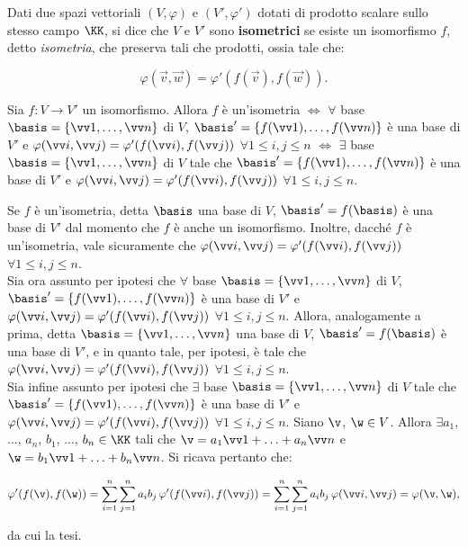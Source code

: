 \documentclass[11pt]{article}
\begin{document}
	\begin{definition}
		Dati due spazi vettoriali $(V, \varphi)$ e
		$(V', \varphi')$ dotati di prodotto scalare sullo stesso campo $\KK$, si dice che
		$V$ e $V'$ sono \textbf{isometrici} se esiste un isomorfismo
		$f$, detto \textit{isometria}, che preserva tali che prodotti, ossia tale che:
		
		\[ \varphi(\vec v, \vec w) = \varphi'(f(\vec v), f(\vec w)). \]
	\end{definition}

	\begin{exercise} Sia $f : V \to V'$ un isomorfismo. Allora $f$ è un'isometria $\iff$ $\forall$ base $\basis = \{ \vv 1, \ldots, \vv n \}$ di $V$, $\basis' = \{ f(\vv 1), \ldots, f(\vv n) \}$ è una base di $V'$ e $\varphi(\vv i, \vv j) = \varphi'(f(\vv i), f(\vv j))$ $\forall 1 \leq i, j \leq n$ $\iff$ $\exists$ base $\basis = \{ \vv 1, \ldots, \vv n \}$ di $V$ tale che $\basis' = \{ f(\vv 1), \ldots, f(\vv n) \}$ è una base di $V'$ e $\varphi(\vv i, \vv j) = \varphi'(f(\vv i), f(\vv j))$ $\forall 1 \leq i, j \leq n$.
	\end{exercise}

	\begin{solution} Se $f$ è un'isometria, detta $\basis$ una base di $V$, $\basis' = f(\basis)$ è una base di $V'$
		dal momento che $f$ è anche un isomorfismo. Inoltre, dacché $f$ è un'isometria, vale sicuramente che
		$\varphi(\vv i, \vv j) = \varphi'(f(\vv i), f(\vv j))$ $\forall 1 \leq i, j \leq n$. \\
		
		Sia ora assunto per ipotesi che $\forall$ base $\basis = \{ \vv 1, \ldots, \vv n \}$ di $V$, $\basis' = \{ f(\vv 1), \ldots, f(\vv n) \}$ è una base di $V'$ e $\varphi(\vv i, \vv j) = \varphi'(f(\vv i), f(\vv j))$ $\forall 1 \leq i, j \leq n$. Allora, analogamente a prima, detta $\basis = \{ \vv 1, \ldots, \vv n \}$ una base di $V$, $\basis' = f(\basis)$ è una base di $V'$, e in quanto tale,
		per ipotesi, è tale che $\varphi(\vv i, \vv j) = \varphi'(f(\vv i), f(\vv j))$ $\forall 1 \leq i, j \leq n$. \\
		
		Sia infine assunto per ipotesi che $\exists$ base $\basis = \{ \vv 1, \ldots, \vv n \}$ di $V$ tale che $\basis' = \{ f(\vv 1), \ldots, f(\vv n) \}$ è una base di $V'$ e $\varphi(\vv i, \vv j) = \varphi'(f(\vv i), f(\vv j))$ $\forall 1 \leq i, j \leq n$. Siano $\v$, $\w \in V$. Allora $\exists a_1$, ..., $a_n$, $b_1$, ..., $b_n \in \KK$
		tali che $\v = a_1 \vv 1 + \ldots + a_n \vv n$ e $\w = b_1 \vv 1 + \ldots + b_n \vv n$. Si ricava pertanto
		che:
		
		\[ \varphi'(f(\v), f(\w)) = \sum_{i=1}^n \sum_{j=1}^n a_i b_j \, \varphi'(f(\vv i), f(\vv j)) =
		\sum_{i=1}^n \sum_{j=1}^n a_i b_j \, \varphi(\vv i, \vv j) = \varphi(\v, \w), \]
		
		da cui la tesi.
	\end{solution}
\end{document}

